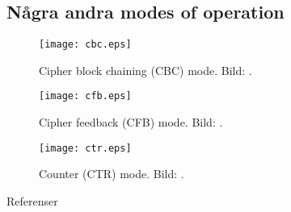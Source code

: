 \documentclass{beamer}
\theoremstyle{definition}
\begin{document}
\subsection{Några andra modes of operation}

\begin{frame}{\insertsubsectionhead}
  \begin{figure}
    \texttt{[image: cbc.eps]}
    \caption{Cipher block chaining (CBC) mode.
    Bild: \cite{Stallings2011can}.}
  \end{figure}
\end{frame}

\begin{frame}{\insertsubsectionhead}
  \begin{figure}
    \texttt{[image: cfb.eps]}
    \caption{Cipher feedback (CFB) mode.
    Bild: \cite{Stallings2011can}.}
  \end{figure}
\end{frame}

\begin{frame}{\insertsubsectionhead}
  \begin{figure}
    \texttt{[image: ctr.eps]}
    \caption{Counter (CTR) mode.
    Bild: \cite{Stallings2011can}.}
  \end{figure}
\end{frame}



\begin{frame}{Referenser}
  \small
  \printbibliography
\end{frame}
\end{document}
